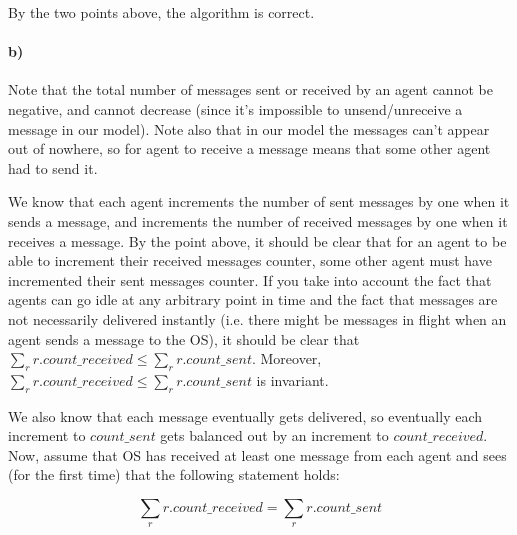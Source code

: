\documentclass[10pt,letter]{article}
\begin{document}
By the two points above, the algorithm is correct.

 \paragraph{b)} Note that the total number of messages sent or received by an agent cannot be negative, and cannot decrease (since it's impossible to unsend/unreceive a message in our model). Note also that in our model the messages can't appear out of nowhere, so for agent to receive a message means that some other agent had to send it.
 
We know that each agent increments the number of sent messages by one when it sends a message, and increments the number of received messages by one when it receives a message. By the point above, it should be clear that for an agent to be able to increment their received messages counter, some other agent must have incremented their sent messages counter. If you take into account the fact that agents can go idle at any arbitrary point in time and the fact that messages are not necessarily delivered instantly (i.e. there might be messages in flight when an agent sends a message to the OS), it should be clear that $\sum\limits_{r} r.count\_received \leq \sum\limits_{r} r.count\_sent$. Moreover, $\sum\limits_{r} r.count\_received \leq \sum\limits_{r} r.count\_sent$ is invariant.

We also know that each message eventually gets delivered, so eventually each increment to $count\_sent$ gets balanced out by an increment to $count\_received$. Now, assume that OS has received at least one message from each agent and sees (for the first time) that the following statement holds:

\[
\sum\limits_{r} r.count\_received = \sum\limits_{r} r.count\_sent
\]
\end{document}
